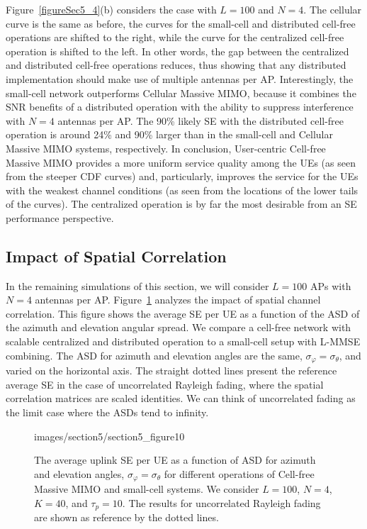 \enlargethispage{\baselineskip} 
 
Figure~\ref{figureSec5_4}(b) considers the case with $L=100$ and $N=4$. The cellular curve is the same as before, the curves for the small-cell and distributed cell-free operations are shifted to the right, while the curve for the centralized cell-free operation is shifted to the left. In other words, the gap between the centralized and distributed cell-free operations reduces, thus showing that any distributed implementation should make use of multiple antennas per AP. Interestingly, the small-cell network outperforms Cellular Massive MIMO, because it combines the SNR benefits of a distributed operation with the ability to suppress interference with $N=4$ antennas per AP.
  The 90\% likely SE with the distributed cell-free operation is around 24\% and 90\% larger than in the small-cell and Cellular Massive MIMO systems, respectively. 
 In conclusion, User-centric Cell-free Massive MIMO provides a more uniform service quality among the UEs (as seen from the steeper CDF curves) and, particularly, improves the service for the UEs with the weakest channel conditions (as seen from the locations of the lower tails of the curves). The centralized operation is by far the most desirable from an SE performance perspective.


\subsection{Impact of Spatial Correlation}

In the remaining simulations of this section, we will consider $L=100$ APs with $N=4$ antennas per AP. 
Figure~\ref{figureSec5_6} analyzes the impact of spatial channel correlation. This figure shows the average SE per UE as a function of the ASD of the azimuth and elevation angular spread. We compare a cell-free network with scalable centralized and distributed operation to a small-cell setup with L-MMSE combining. The ASD for azimuth and elevation angles are the same, $\sigma_{\varphi}=\sigma_{\theta}$, and varied on the horizontal axis. The straight dotted lines present the reference average SE in the case of uncorrelated Rayleigh fading, where the spatial correlation matrices are scaled identities. We can think of uncorrelated fading as the limit case where the ASDs tend to infinity. 
 
\begin{figure}[t!]\centering
	\begin{overpic}[width=0.88\columnwidth,tics=10]{images/section5/section5_figure10}
	\end{overpic} 
	\caption{The average uplink SE per UE as a function of ASD for azimuth and elevation angles, $\sigma_{\varphi}=\sigma_{\theta}$ for different operations of Cell-free Massive MIMO and small-cell systems. We consider $L=100$, $N=4$, $K=40$, and $\tau_p=10$. The results for uncorrelated Rayleigh fading are shown as reference by the dotted lines.}    \vspace{+1mm}
	\label{figureSec5_6} 
\end{figure}

